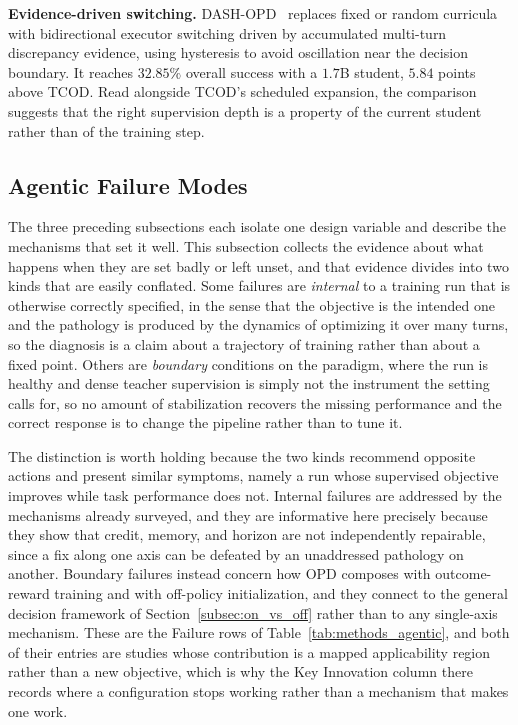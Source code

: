 \documentclass{article} %
\begin{document}
\textbf{Evidence-driven switching.} DASH-OPD~\citep{2607.29078} replaces fixed or random curricula with bidirectional executor switching driven by accumulated multi-turn discrepancy evidence, using hysteresis to avoid oscillation near the decision boundary. It reaches $32.85\%$ overall success with a $1.7$B student, $5.84$ points above TCOD. Read alongside TCOD's scheduled expansion, the comparison suggests that the right supervision depth is a property of the current student rather than of the training step.

\subsection{Agentic Failure Modes}
\label{subsec:agentic_failure}

The three preceding subsections each isolate one design variable and describe the mechanisms that set it well. This subsection collects the evidence about what happens when they are set badly or left unset, and that evidence divides into two kinds that are easily conflated. Some failures are \emph{internal} to a training run that is otherwise correctly specified, in the sense that the objective is the intended one and the pathology is produced by the dynamics of optimizing it over many turns, so the diagnosis is a claim about a trajectory of training rather than about a fixed point. Others are \emph{boundary} conditions on the paradigm, where the run is healthy and dense teacher supervision is simply not the instrument the setting calls for, so no amount of stabilization recovers the missing performance and the correct response is to change the pipeline rather than to tune it.

The distinction is worth holding because the two kinds recommend opposite actions and present similar symptoms, namely a run whose supervised objective improves while task performance does not. Internal failures are addressed by the mechanisms already surveyed, and they are informative here precisely because they show that credit, memory, and horizon are not independently repairable, since a fix along one axis can be defeated by an unaddressed pathology on another. Boundary failures instead concern how OPD composes with outcome-reward training and with off-policy initialization, and they connect to the general decision framework of Section~\ref{subsec:on_vs_off} rather than to any single-axis mechanism. These are the Failure rows of Table~\ref{tab:methods_agentic}, and both of their entries are studies whose contribution is a mapped applicability region rather than a new objective, which is why the Key Innovation column there records where a configuration stops working rather than a mechanism that makes one work.
\end{document}
